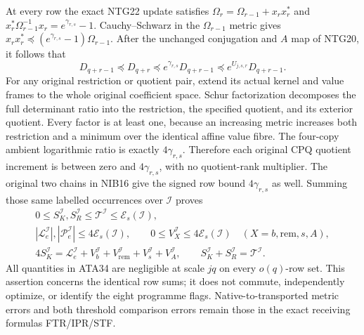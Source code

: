 At every row the exact NTG22 update satisfies
$\Omega_r=\Omega_{r-1}+x_rx_r^*$ and
$x_r^*\Omega_{r-1}^{-1}x_r=e^{\gamma_{r,s}}-1$.
Cauchy--Schwarz in the $\Omega_{r-1}$ metric gives
$x_rx_r^*\preceq(e^{\gamma_{r,s}}-1)\Omega_{r-1}$.
After the unchanged conjugation and $A$ map of NTG20, it follows that
\[
 D_{q+r-1}\preceq D_{q+r}
        \preceq e^{\gamma_{r,s}}D_{q+r-1}
        \preceq e^{U_{j,s,r}}D_{q+r-1}.                 \tag{ATA33}
\]
For any original restriction or quotient pair, extend its actual
kernel and value frames to the whole original coefficient space.
Schur factorization decomposes the full determinant ratio into the
restriction, the specified quotient, and its exterior quotient.
Every factor is at least one, because an increasing metric increases
both restriction and a minimum over the identical affine value fibre.
The four-copy ambient logarithmic ratio is exactly $4\gamma_{r,s}$.
Therefore each original CPQ quotient increment is between zero and
$4\gamma_{r,s}$, with no quotient-rank multiplier.  The original
two chains in NIB16 give the signed row bound $4\gamma_{r,s}$ as
well.  Summing those same labelled occurrences over $\mathscr I$
proves
\[
\begin{gathered}
 0\le S_K^{\mathscr I},S_R^{\mathscr I}
       \le\mathcal T^{\mathscr I}\le\mathcal E_s(\mathscr I),\\
 |\mathcal L_e^{\mathscr I}|,|\mathcal P_e^{\mathscr I}|
          \le4\mathcal E_s(\mathscr I),\qquad
 0\le V_X^{\mathscr I}\le4\mathcal E_s(\mathscr I)
                       \quad(X=b,\mathrm{rem},s,A),\\
 4S_K^{\mathscr I}=\mathcal L_e^{\mathscr I}
       +V_b^{\mathscr I}+V_{\mathrm{rem}}^{\mathscr I}
       +V_s^{\mathscr I}+V_A^{\mathscr I},\qquad
 S_K^{\mathscr I}+S_R^{\mathscr I}=\mathcal T^{\mathscr I}.
\end{gathered}\tag{ATA34}
\]
All quantities in ATA34 are negligible at scale $jq$ on every
$o(q)$-row set.  This assertion concerns the identical row sums;
it does not commute, independently optimize, or identify the eight
programme flags.  Native-to-transported metric errors and both
threshold comparison errors remain those in the exact receiving
formulas FTR/IPR/STF.

